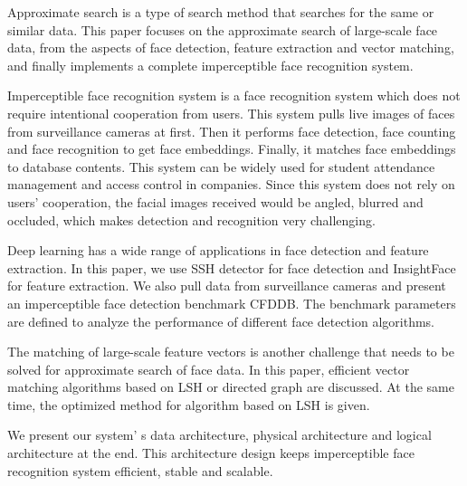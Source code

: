 \begin{englishabstract}

Approximate search is a type of search method that searches for the same or similar data. This paper focuses on the approximate search of large-scale face data, from the aspects of face detection, feature extraction and vector matching, and finally implements a complete imperceptible face recognition system.

Imperceptible face recognition system is a face recognition system which does not require intentional cooperation from users. This system pulls live images of faces from surveillance cameras at first. Then it performs face detection, face counting and face recognition to get face embeddings. Finally, it matches face embeddings to database contents. This system can be widely used for student attendance management and access control in companies. Since this system does not rely on users’ cooperation, the facial images received would be angled, blurred and occluded, which makes detection and recognition very challenging.

Deep learning has a wide range of applications in face detection and feature extraction. In this paper, we use SSH detector \cite{najibi2017ssh} for face detection and InsightFace\cite{deng2018arcface} for feature extraction. We also pull data from surveillance cameras and present an imperceptible face detection benchmark CFDDB. The benchmark parameters are defined to analyze the performance of different face detection algorithms.

The matching of large-scale feature vectors is another challenge that needs to be solved for approximate search of face data. In this paper, efficient vector matching algorithms based on LSH or directed graph are discussed. At the same time, the optimized method for algorithm based on LSH is given.

We present our system’ s data architecture, physical architecture and logical architecture at the end. This architecture design keeps imperceptible face recognition system efficient, stable and scalable.

\end{englishabstract}

